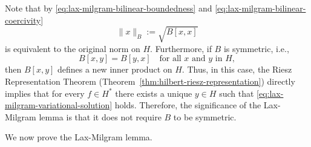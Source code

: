 \begin{Remark}
\label{rem:lax-milgram-nonsymmetric-significance}
Note that by \eqref{eq:lax-milgram-bilinear-boundedness} and \eqref{eq:lax-milgram-bilinear-coercivity}
\begin{equation}\label{eq:coercive-bilinear-induced-equivalent-norm}
\|x\|_B:=\sqrt{B[x,x]}
\end{equation}
is equivalent to the original norm on $H$. Furthermore, if $B$ is symmetric, i.e.,
\begin{equation}\label{eq:symmetric-bilinear-form-condition}
B[x,y]=B[y,x]\quad\text{for all }x\text{ and }y\text{ in }H,
\end{equation}
then $B[x,y]$ defines a new inner product on $H$. Thus, in this case, the Riesz Representation Theorem (Theorem~\ref{thm:hilbert-riesz-representation}) directly implies that for every $f\in H^*$ there exists a unique $y\in H$ such that \eqref{eq:lax-milgram-variational-solution} holds. Therefore, the significance of the Lax-Milgram lemma is that it does not require $B$ to be symmetric.
\end{Remark}

We now prove the Lax-Milgram lemma.

